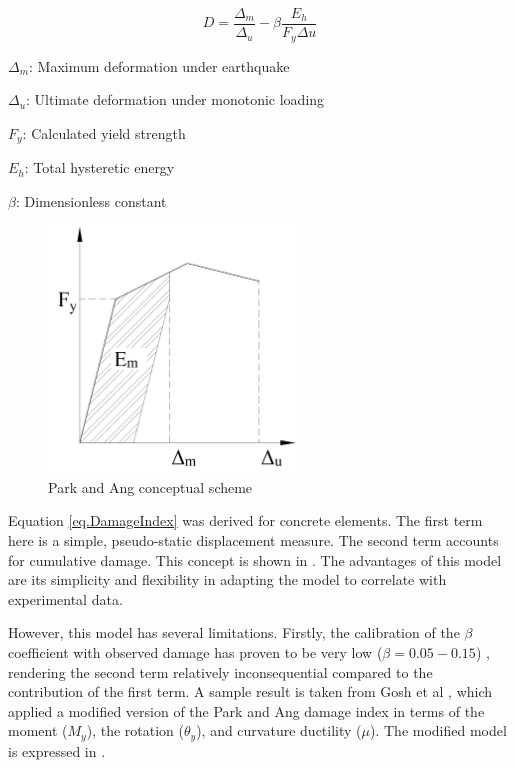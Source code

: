 \begin{equation}
  D=\frac{\Delta_{m}}{\Delta_{u}}-\beta \frac{E_h}{F_{y}\Delta{u}}
  \label{eq.DamageIndex}
\end{equation} 

$\Delta_{m}$: Maximum deformation under earthquake

$\Delta_{u}$: Ultimate deformation under monotonic loading

$F_{y}$: Calculated yield strength

$E_{h}$: Total hysteretic energy

$\beta$: Dimensionless constant 

\begin{figure}[htbp]
\centering
\includegraphics[width=0.6\textwidth]{Chapter-2/figs/Park_and_Ang_Model}
\caption{Park and Ang conceptual scheme}
\label{fig:Paa}
\end{figure}

Equation \ref{eq.DamageIndex} was derived for concrete elements. The first term here is a simple, pseudo-static displacement measure. The second term accounts for cumulative damage. This concept is shown in . The advantages of this model are its simplicity and flexibility in adapting the model to correlate with experimental data.  

However, this model has several limitations. Firstly, the calibration of the $\beta$ coefficient with observed damage has proven to be very low ($\beta=0.05-0.15$) \cite{Young-JiPark1985} \cite{Ghosh2015}, rendering the second term relatively inconsequential compared to the contribution of the first term. A sample result is taken from Gosh et al \cite{Ghosh2015}, which applied a modified version of the Park and Ang damage index in terms of the moment ($M_{y}$), the rotation ($\theta_y$), and curvature ductility ($\mu$). The modified model is expressed in .

